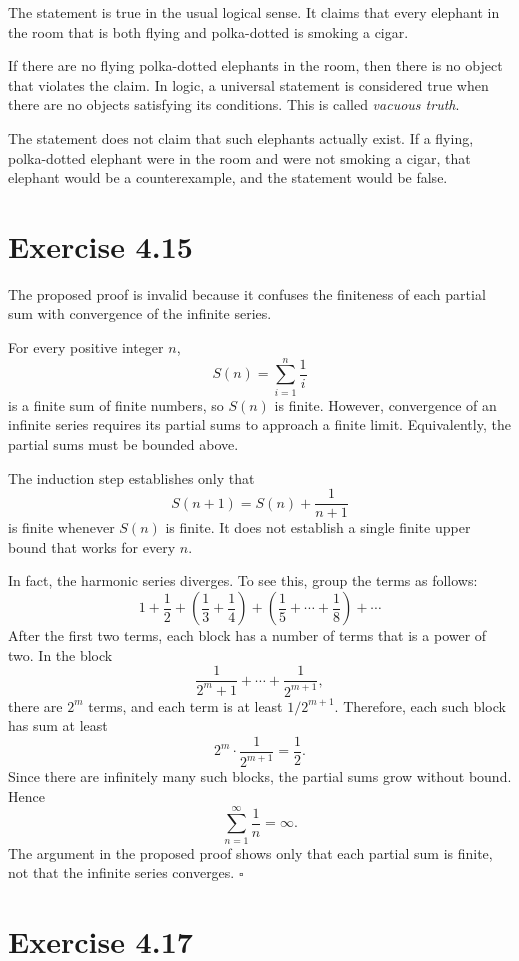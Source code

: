 \documentclass[11pt]{article}
\newcommand{\qed}{\hfill$\square$}
\begin{document}
The statement is true in the usual logical sense.
It claims that every elephant in the room that is both
flying and polka-dotted is smoking a cigar.

If there are no flying polka-dotted elephants in the
room, then there is no object that violates the claim.
In logic, a universal statement is considered true when
there are no objects satisfying its conditions. This
is called \textit{vacuous truth}.

The statement does not claim that such elephants
actually exist. If a flying, polka-dotted elephant were
in the room and were not smoking a cigar, that elephant
would be a counterexample, and the statement would be
false.

\section*{Exercise 4.15}

The proposed proof is invalid because it confuses the
finiteness of each partial sum with convergence of the
infinite series.

For every positive integer $n$,
\[
S(n)=\sum_{i=1}^{n}\frac1i
\]
is a finite sum of finite numbers, so $S(n)$ is finite.
However, convergence of an infinite series requires its
partial sums to approach a finite limit. Equivalently,
the partial sums must be bounded above.

The induction step establishes only that
\[
S(n+1)=S(n)+\frac{1}{n+1}
\]
is finite whenever $S(n)$ is finite. It does not
establish a single finite upper bound that works for
every $n$.

In fact, the harmonic series diverges. To see this,
group the terms as follows:
\[
1+\frac12+
\left(\frac13+\frac14\right)+
\left(\frac15+\cdots+\frac18\right)+\cdots
\]
After the first two terms, each block has a number of
terms that is a power of two. In the block
\[
\frac{1}{2^m+1}+\cdots+\frac{1}{2^{m+1}},
\]
there are $2^m$ terms, and each term is at least
$1/2^{m+1}$. Therefore, each such block has sum at
least
\[
2^m\cdot\frac{1}{2^{m+1}}=\frac12.
\]
Since there are infinitely many such blocks, the
partial sums grow without bound. Hence
\[
\sum_{n=1}^{\infty}\frac1n=\infty.
\]
The argument in the proposed proof shows only that
each partial sum is finite, not that the infinite
series converges. \qed

\section*{Exercise 4.17}
\end{document}
